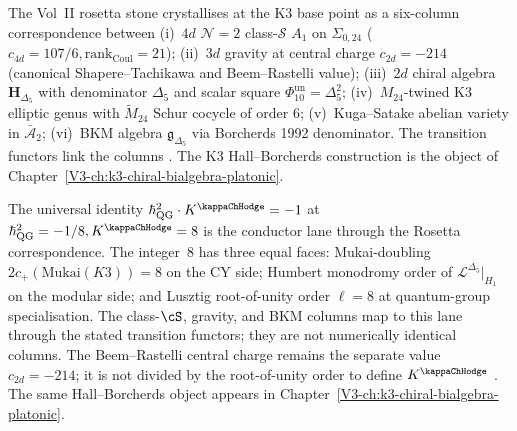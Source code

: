 \begin{remark}
\label{rem:rs-1}
The Vol~II rosetta stone crystallises at the K3 base point as
a six-column correspondence between
(i)~$4d$ $\mathcal N=2$ class-$\mathcal S$ $A_1$ on $\Sigma_{0,24}$
($c_{4d}=107/6, \mathrm{rank}_{\mathrm{Coul}}=21$);
(ii)~$3d$ gravity at central charge $c_{2d}=-214$
(canonical Shapere--Tachikawa and Beem--Rastelli value);
(iii)~$2d$ chiral algebra $\mathbf H_{\Delta_5}$ with denominator
$\Delta_5$ and scalar square $\Phi_{10}^{\mathrm{un}}=\Delta_5^2$;
(iv)~$M_{24}$-twined K3 elliptic genus with $\widetilde M_{24}$ Schur
cocycle of order $6$;
(v)~Kuga--Satake abelian variety in $\bar{\mathcal A}_2$;
(vi)~BKM algebra $\mathfrak g_{\Delta_5}$ via Borcherds 1992 denominator.
The transition functors link the
columns \cite{Gaiotto2009,Borcherds1992,ChengDuncanHarvey2014}.
The K3 Hall--Borcherds construction is the object of
Chapter~\ref{V3-ch:k3-chiral-bialgebra-platonic}.
\end{remark}

\begin{remark}
\label{rem:rs-2}
The universal identity $\hbar_{\mathrm{QG}}^2\cdot K^{\kappaChHodge} = -1$ at
$\hbar_{\mathrm{QG}}^2 = -1/8, K^{\kappaChHodge} = 8$ is the
conductor lane through the Rosetta correspondence. The integer~$8$
has three equal faces: Mukai-doubling
$2c_+(\mathrm{Mukai}(K3)) = 8$ on the CY side; Humbert monodromy
order of $\mathcal L^{\Delta_5}|_{H_1}$ on the modular side; and
Lusztig root-of-unity order $\ell = 8$ at quantum-group
specialisation. The class-$\cS$, gravity, and BKM columns map to this
lane through the stated transition functors; they are not numerically
identical columns. The Beem--Rastelli central charge remains the
separate value $c_{2d}=-214$; it is not divided by the root-of-unity
order to define $K^{\kappaChHodge}$
\cite{Mukai1987,Lusztig1990,Bruinier2002}. The same Hall--Borcherds
object appears in Chapter~\ref{V3-ch:k3-chiral-bialgebra-platonic}.
\end{remark}
